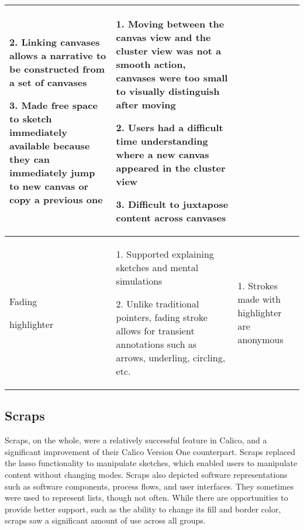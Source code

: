 \begin{center}
\begin{longtable}{|p{3cm}|p{6cm}|p{6cm}|}
2. Linking canvases allows a narrative to be constructed from a set of canvases

3. Made free space to sketch immediately available because they can immediately jump to new canvas or copy a previous one

&
1. Moving between the canvas view and the cluster view was not a smooth action, canvases were too small to visually distinguish after moving

2. Users had a difficult time understanding where a new canvas appeared in the cluster view

3. Difficult to juxtapose content across canvases

 \\
\hline
Fading 

highlighter &
1. Supported explaining sketches and mental simulations

2. Unlike traditional pointers, fading stroke allows for transient annotations such as arrows, underling, circling, etc.

&
1. Strokes made with highlighter are anonymous

\label{chapter:discussion:strengths-weaknesses}
\end{longtable}
\end{center}

\subsection{Scraps}
Scraps, on the whole, were a relatively successful feature in Calico, and a significant improvement of their Calico Version One counterpart. Scraps replaced the lasso functionality to manipulate sketches, which enabled users to manipulate content without changing modes. Scraps also depicted software representations such as software components, process flows, and user interfaces. They sometimes were used to represent lists, though not often. While there are opportunities to provide better support, such as the ability to change its fill and border color, scraps saw a significant amount of use across all groups. 


